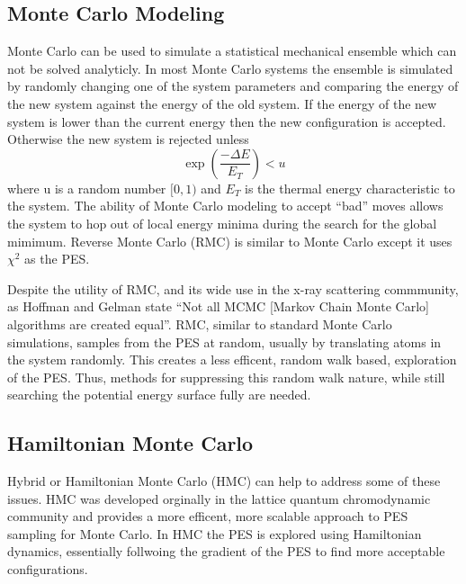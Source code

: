 \subsection{Monte Carlo Modeling}
Monte Carlo can be used to simulate a statistical mechanical ensemble which can not be solved analyticly.
In most Monte Carlo systems the ensemble is simulated by randomly changing one of the system parameters and comparing the energy of the new system against the energy of the old system.
If the energy of the new system is lower than the current energy then the new configuration is accepted.
Otherwise the new system is rejected unless
\begin{equation}
\exp(\frac{-\Delta E}{E_{T}}) < u
\end{equation}
where u is a random number $[0, 1)$ and $E_{T}$ is the thermal energy characteristic to the system.
The ability of Monte Carlo modeling to accept ``bad'' moves allows the system to hop out of local energy minima during the search for the global mimimum.
Reverse Monte Carlo (RMC) is similar to Monte Carlo except it uses $\chi^{2}$ as the PES.\cite{McGreevy}

Despite the utility of RMC, and its wide use in the x-ray scattering commmunity, as Hoffman and Gelman state ``Not all MCMC [Markov Chain Monte Carlo] algorithms are created equal''.\cite{Hoffman2014}
RMC, similar to standard Monte Carlo simulations, samples from the PES at random, usually by translating atoms in the system randomly.
This creates a less efficent, random walk based, exploration of the PES.\cite{Hoffman2014, Neal1993}
Thus, methods for suppressing this random walk nature, while still searching the potential energy surface fully are needed.

\subsection{Hamiltonian Monte Carlo}
Hybrid or Hamiltonian Monte Carlo (HMC) can help to address some of these issues.
HMC was developed orginally in the lattice quantum chromodynamic community and provides a more efficent, more scalable approach to PES sampling for Monte Carlo.\cite{Duane1987216, Neal2011}
In HMC the PES is explored using Hamiltonian dynamics, essentially follwoing the gradient of the PES to find more acceptable configurations.


